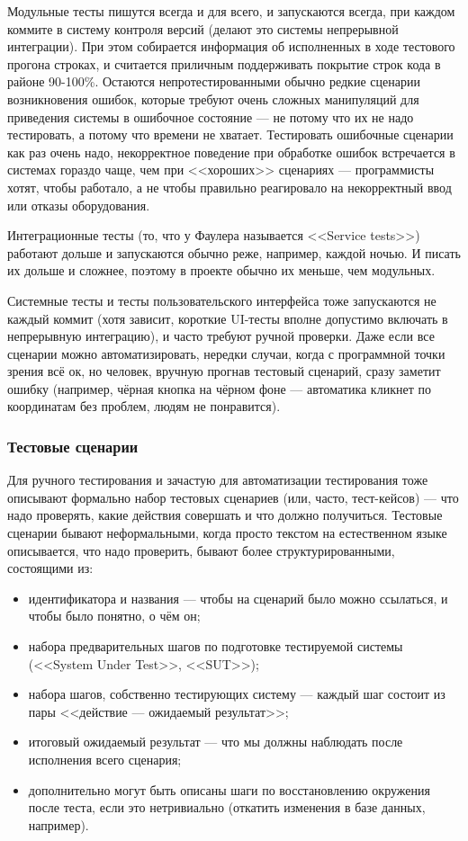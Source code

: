 \documentclass{../../text-style}
\begin{document}
Модульные тесты пишутся всегда и для всего, и запускаются всегда, при каждом коммите в систему контроля версий (делают это системы непрерывной интеграции). При этом собирается информация об исполненных в ходе тестового прогона строках, и считается приличным поддерживать покрытие строк кода в районе 90-100\%. Остаются непротестированными обычно редкие сценарии возникновения ошибок, которые требуют очень сложных манипуляций для приведения системы в ошибочное состояние --- не потому что их не надо тестировать, а потому что времени не хватает. Тестировать ошибочные сценарии как раз очень надо, некорректное поведение при обработке ошибок встречается в системах гораздо чаще, чем при <<хороших>> сценариях --- программисты хотят, чтобы работало, а не чтобы правильно реагировало на некорректный ввод или отказы оборудования.

Интеграционные тесты (то, что у Фаулера называется <<Service tests>>) работают дольше и запускаются обычно реже, например, каждой ночью. И писать их дольше и сложнее, поэтому в проекте обычно их меньше, чем модульных.

Системные тесты и тесты пользовательского интерфейса тоже запускаются не каждый коммит (хотя зависит, короткие UI-тесты вполне допустимо включать в непрерывную интеграцию), и часто требуют ручной проверки. Даже если все сценарии можно автоматизировать, нередки случаи, когда с программной точки зрения всё ок, но человек, вручную прогнав тестовый сценарий, сразу заметит ошибку (например, чёрная кнопка на чёрном фоне --- автоматика кликнет по координатам без проблем, людям не понравится).

\subsubsection{Тестовые сценарии}

Для ручного тестирования и зачастую для автоматизации тестирования тоже описывают формально набор тестовых сценариев (или, часто, тест-кейсов) --- что надо проверять, какие действия совершать и что должно получиться. Тестовые сценарии бывают неформальными, когда просто текстом на естественном языке описывается, что надо проверить, бывают более структурированными, состоящими из:

\begin{itemize}
    \item идентификатора и названия --- чтобы на сценарий было можно ссылаться, и чтобы было понятно, о чём он;
    \item набора предварительных шагов по подготовке тестируемой системы (<<System Under Test>>, <<SUT>>);
    \item набора шагов, собственно тестирующих систему --- каждый шаг состоит из пары <<действие --- ожидаемый результат>>;
    \item итоговый ожидаемый результат --- что мы должны наблюдать после исполнения всего сценария;
    \item дополнительно могут быть описаны шаги по восстановлению окружения после теста, если это нетривиально (откатить изменения в базе данных, например).
\end{itemize}
\end{document}
